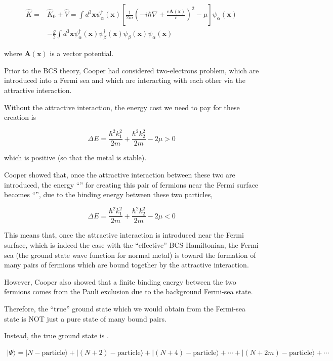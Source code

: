 \[\begin{split}
\hat{K} =& \hat{K}_0 + \hat{V} = \int d^3 \bm{x} \psi^{\dagger}_{\alpha}(\bm{x})\left[\frac{1}{2m}\left(-i\hbar \nabla + \frac{e\bm{A}(\bm{x})}{c}\right)^2-\mu\right]\psi_{\alpha}(\bm{x})\\
&-\frac{g}{2}\int d^3\bm{x}\psi^{\dagger}_{\alpha}(\bm{x})\psi^{\dagger}_{\beta}(\bm{x})\psi_{\beta}(\bm{x})\psi_{\alpha}(\bm{x})
\end{split} \]

where $\bm{A}(\bm{x})$ is a vector potential. 

Prior to the BCS theory, Cooper had considered two-electrons problem, which are introduced into a Fermi sea and which are interacting with each other via the attractive interaction. 

Without the attractive interaction, the energy cost we need to pay for these creation is 

\[\Delta E = \frac{\hbar^2 k_1^2}{2m} + \frac{\hbar^2 k_2^2}{2m}-2\mu > 0 \]

which is positive (so that the metal is stable). 

Cooper showed that, once the {} attractive interaction between these two are introduced, the energy ``'' for creating this pair of fermions near the Fermi surface becomes ``'', due to the binding energy between these two particles, 

\[\Delta E = \frac{\hbar^2 k_1^2}{2m} + \frac{\hbar^2 k_2^2}{2m}-2\mu < 0 \]

This means that, once the attractive interaction is introduced near the Fermi surface, which is indeed the case with the ``effective'' BCS Hamiltonian, the Fermi sea (the ground state wave function for normal metal) is  toward the formation of many pairs of fermions which are bound together by the attractive interaction. 

However, Cooper also showed that a finite binding energy between the two fermions comes from the Pauli exclusion due to the background Fermi-sea state. 

Therefore, the ``true'' ground state which we would obtain from the Fermi-sea state is NOT just a pure state of many bound pairs. 

Instead, the true ground state is . 

\begin{align}\tag{A} \label{eqA}
|\Psi\rangle = |N-\text{particle}\rangle + |(N+2)-\text{particle}\rangle + |(N+4)-\text{particle}\rangle + \cdots + |(N+2m)-\text{particle}\rangle + \cdots \end{align}

